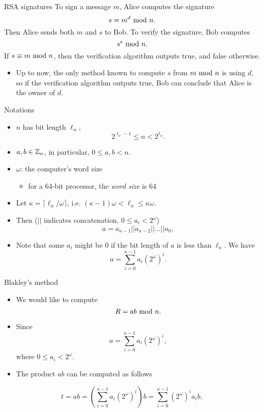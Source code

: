 \begin{frame}{RSA signatures}
To sign a message $m$, Alice computes the signature
\[
s=m^d\textrm{~mod~} n.
\]
Then Alice sends both $m$ and $s$ to Bob.
To verify the signature, Bob computes
\[
s^e\textrm{~mod~} n.
\]
If $s\equiv m\textrm{~mod~} n$, then the verification algorithm outputs true, and false otherwise.
\begin{itemize}
    \item Up to now, the only method known to compute $s$ from $m\textrm{~mod~} n$ is using $d$, so if the verification algorithm outputs true, Bob can conclude that Alice is the owner of $d$.
\end{itemize}
\end{frame}

\begin{frame}{Notations}
    \begin{itemize}
        \item $n$ has bit length $\ell_n$, 
\begin{equation*}
    2^{\ell_n-1}\leq n<2^{\ell_n}.
\end{equation*}
        \item $a, b\in{\mathbb Z}_n$, in particular, $0\leq a,b<n$.
       \item $\omega$: the computer's word size
       \begin{itemize}
           \item for a 64-bit processor, the \textit{word size} is 64
       \end{itemize}
       \item Let $\kappa=\lceil \ell_n/\omega\rceil$, i.e. $(\kappa-1)\omega<\ell_n\leq \kappa\omega$.
      \item Then ($||$ indicates concatenation, $0\leq a_i< 2^{\omega}$)
\[
a=a_{\kappa-1}||a_{\kappa-2}||\dots||a_0,
\]
      \item Note that some $a_i$ might be $0$ if the bit length of $a$ is less than $\ell_n$. We have
\begin{equation*}
a=\sum_{i=0}^{\kappa-1}a_i(2^\omega)^i.
\end{equation*}
    \end{itemize}
\end{frame}

\begin{frame}{Blakley's method}
\begin{itemize}
\item We would like to compute
\[
R=ab\textrm{~mod~} n.
\]
\item Since
\begin{equation*}
a=\sum_{i=0}^{\kappa-1}a_i(2^\omega)^i,
\end{equation*}
where $0\leq a_i< 2^{\omega}$.
 \item The product $ab$ can be computed as follows
\end{itemize}
\[
t=ab=\left(\sum_{i=0}^{\kappa-1} a_i(2^\omega)^i\right)b=\sum_{i=0}^{\kappa-1}(2^\omega)^ia_ib,
\]
\end{frame}

